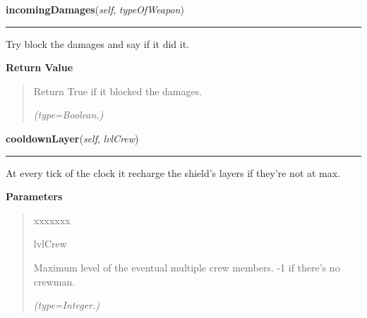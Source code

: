 \hspace{.8\funcindent}\begin{boxedminipage}{\funcwidth}

    \raggedright \textbf{incomingDamages}(\textit{self}, \textit{typeOfWeapon})

    \vspace{-1.5ex}

    \rule{\textwidth}{0.5\fboxrule}
\setlength{\parskip}{2ex}
    Try block the damages and say if it did it.

\setlength{\parskip}{1ex}
      \textbf{Return Value}
    \vspace{-1ex}

      \begin{quote}
      Return True if it blocked the damages.

      {\it (type=Boolean.)}

      \end{quote}

    \end{boxedminipage}

    \label{systems:Shields:cooldownLayer}

    \vspace{0.5ex}

\hspace{.8\funcindent}\begin{boxedminipage}{\funcwidth}

    \raggedright \textbf{cooldownLayer}(\textit{self}, \textit{lvlCrew})

    \vspace{-1.5ex}

    \rule{\textwidth}{0.5\fboxrule}
\setlength{\parskip}{2ex}
    At every tick of the clock it recharge the shield's layers if they're 
    not at max.

\setlength{\parskip}{1ex}
      \textbf{Parameters}
      \vspace{-1ex}

      \begin{quote}
        \begin{Ventry}{xxxxxxx}

          \item[lvlCrew]

          Maximum level of the eventual multiple crew members. -1 if 
          there's no crewman.

            {\it (type=Integer.)}

        \end{Ventry}

      \end{quote}

    \end{boxedminipage}

